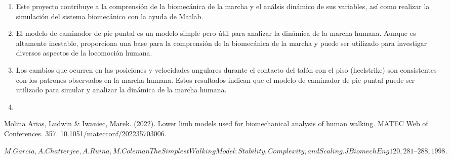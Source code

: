 \documentclass[journal,transmag]{IEEEtran}
\begin{document}
	\begin{enumerate}[label=(\roman*)]

	 \item  Este proyecto contribuye a la comprensión de la biomecánica de la marcha y el análsis dinámico de sus variables, así como realizar la simulación del sistema biomecánico con la ayuda de Matlab. 

    \item  El modelo de caminador de pie puntal es un modelo simple pero útil para analizar la dinámica de la marcha humana. Aunque es altamente inestable, proporciona una base para la comprensión de la biomecánica de la marcha y puede ser utilizado para investigar diversos aspectos de la locomoción humana.
   

     \item  Los cambios que ocurren en las posiciones y velocidades angulares durante el contacto del talón con el piso (heelstrike) son consistentes con los patrones observados en la marcha humana. Estos resultados indican que el modelo de caminador de pie puntal puede ser utilizado para simular y analizar la dinámica de la marcha humana.

      \item  


	\end{enumerate}

\appendices


\ifCLASSOPTIONcaptionsoff
  \newpage
\fi


\begin{thebibliography}{1}


  Molina Arias, Ludwin \& Iwaniec, Marek. (2022). Lower limb models used for biomechanical analysis of human walking. MATEC Web of Conferences. 357. 10.1051/matecconf/202235703006. 

 $M. Garcia, A. Chatterjee, A. Ruina, M. Coleman The Simplest Walking Model: Stability, Complexity, and Scaling. J Biomech Eng 120, 281–288, 1998.$
\end{thebibliography}
\end{document}
